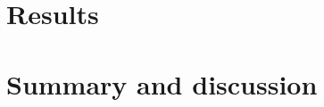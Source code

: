 \documentclass[article]{jss}
\begin{document}
\section{Results} \label{sec:results}





\section{Summary and discussion} \label{sec:summary}










\end{document}
